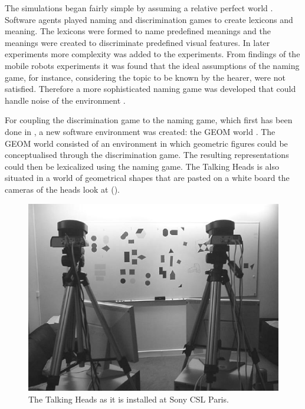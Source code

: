 The simulations began fairly simple by assuming a relative perfect world \citep{steels:1996a,steels:1996b}. Software agents played naming and discrimination games to create lexicons and meaning. The lexicons were formed to name predefined meanings and the meanings were created to discriminate predefined visual features. In later experiments more complexity was added to the experiments. From findings of the mobile robots experiments \citep{vogt:1998a} it was found that the ideal assumptions of the naming game, for instance, considering the topic to be known by the hearer, were not satisfied. Therefore a more sophisticated naming game was developed that could handle noise of the environment \citep{steelskaplan:1998}. 

For coupling the discrimination game to the naming game, which first has been done in \citep{steelsvogt:1997}, a new software environment was created: the GEOM world \citep{steels:2000}. The GEOM world consisted of an environment in which geometric figures could be conceptualised through the discrimination game. The resulting representations could then be lexicalized using the naming game. The Talking Heads is also situated in a world of geometrical shapes that are pasted on a white board the cameras of the heads look at ().

\begin{figure}[t]
\centering
\includegraphics[width=12cm]{theory/th.eps}
\caption{The Talking Heads as it is installed at Sony CSL Paris.}
\label{f:theory:talkingheads}
\end{figure}


